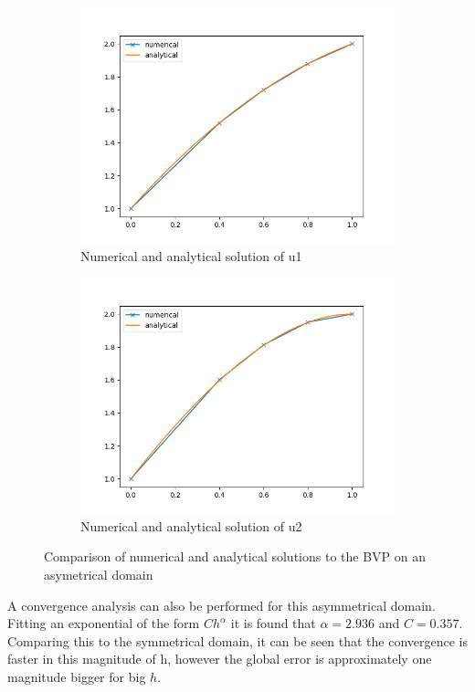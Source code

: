 \documentclass{article}
\begin{document}
\begin{figure}[H]
    \begin{subfigure}{.5\textwidth}
      \centering
      \includegraphics[width=.9\linewidth]{u1asym.png}
      \caption{Numerical and analytical solution of u1}
    \end{subfigure}%
    \begin{subfigure}{.5\textwidth}
      \centering
      \includegraphics[width=.9\linewidth]{u2asym.png}
      \caption{Numerical and analytical solution of u2}
    \end{subfigure}
    \caption{Comparison of numerical and analytical solutions to the BVP on an asymetrical domain}
\end{figure}
A convergence analysis can also be performed for this asymmetrical domain. Fitting an exponential of the form $Ch^{\alpha}$ it is found that $\alpha=2.936$ and $C=0.357$. Comparing this to the symmetrical domain, it can be seen that the convergence is faster in this magnitude of h, however the global error is  approximately one magnitude bigger for big $h$.
\end{document}
